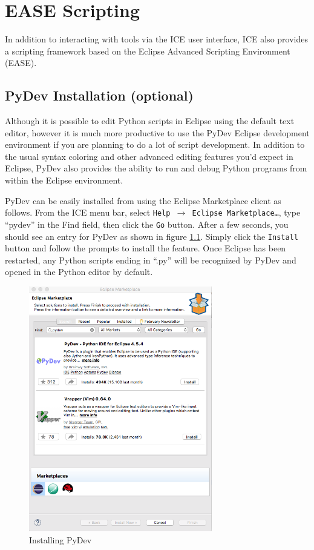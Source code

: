 \chapter{EASE Scripting}

In addition to interacting with tools via the ICE user interface, ICE also
provides a scripting framework based on the Eclipse Advanced Scripting
Environment (EASE). 

\section{PyDev Installation (optional)} 

Although it is possible to edit Python scripts in Eclipse using the default text editor,
however it is much more productive to use the PyDev Eclipse development
environment if you are planning to do a lot of script development. In addition to the 
usual syntax coloring and other advanced editing features you'd expect in Eclipse, 
PyDev also provides the ability to run and debug Python programs from within the Eclipse environment.

PyDev can be easily installed from using the Eclipse Marketplace client as
follows. From the ICE menu bar, select \texttt{Help $\rightarrow$ Eclipse
Marketplace\ldots}, type ``pydev'' in the Find field, then click the \texttt{Go}
button.
After a few seconds, you should see an entry for PyDev as shown in figure
\ref{fig:pydev}.
Simply click the \texttt{Install} button and follow the prompts to install the feature. Once
Eclipse has been restarted, any Python scripts ending in ``.py'' will be recognized by
PyDev and opened in the Python editor by default.

\begin{figure}[!ht]
\centering
\includegraphics[width=8cm]{images/pydev-marketplace}
\caption{Installing PyDev}
\label{fig:pydev}
\end{figure}

